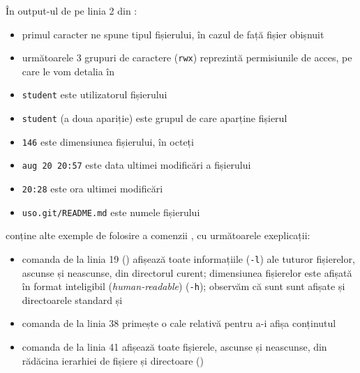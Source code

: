 
În output-ul de pe linia 2 din :

\begin{itemize}
  \item primul caracter ne spune tipul fișierului, în cazul de față fișier obișnuit
  \item următoarele 3 grupuri de caractere (\texttt{rwx}) reprezintă permisiunile de acces, pe care le vom detalia în 
  \item \texttt{student} este utilizatorul fișierului \item \texttt{student} (a doua apariție) este grupul de care aparține fișierul
  \item \texttt{146} este dimensiunea fișierului, în octeți
  \item \texttt{aug 20 20:57} este data ultimei modificări a fișierului
  \item \texttt{20:28} este ora ultimei modificări
  \item \texttt{uso.git/README.md} este numele fișierului
\end{itemize}

 conține alte exemple de folosire a comenzii , cu următoarele exeplicații:

\begin{itemize}
  \item comanda de la linia 19 () afișează toate informațiile (\texttt{-l}) ale tuturor fișierelor, ascunse și neascunse, din directorul curent; dimensiunea fișierelor este afișată în format inteligibil (\textit{human-readable}) (\texttt{-h}); observăm că sunt sunt afișate și directoarele standard  și 
  \item comanda de la linia 38 primește o cale relativă pentru a-i afișa conținutul
  \item comanda de la linia 41 afișează toate fișierele, ascunse și neascunse, din rădăcina ierarhiei de fișiere și directoare (\file{/})
\end{itemize}

